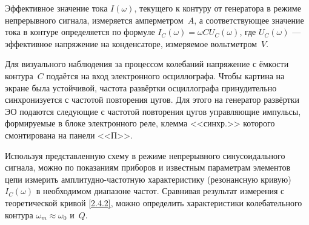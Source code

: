 Эффективное значение тока $I(\omega)$, текущего к контуру от генератора 
в режиме непрерывного сигнала, измеряется амперметром~$A$, 
а соответствующее значение тока в контуре определяется по формуле
$I_C(\omega)=\omega C U_C(\omega)$,
где $U_C(\omega)$ --- эффективное напряжение на конденсаторе, 
измеряемое вольтметром~$V$.

Для визуального наблюдения за процессом колебаний напряжение с ёмкости 
контура~$C$ подаётся на вход электронного осциллографа. Чтобы картина на 
экране была устойчивой, частота развёртки осциллографа принудительно 
синхронизуется с частотой повторения цугов. Для этого на генератор 
развёртки ЭО подаются следующие с частотой повторения цугов управляющие 
импульсы, формируемые в блоке электронного реле, клемма <<синхр.>> которого 
смонтирована на панели <<П>>.

Используя представленную схему в режиме непрерывного синусоидального 
сигнала, можно по показаниям приборов и известным параметрам элементов 
цепи измерить амплитудно-частотную характеристику (резонансную кривую) 
$I_C(\omega)$ в необходимом диапазоне частот. 
Сравнивая результат измерения с теоретической кривой \eqref{2.4.2}, можно 
определить характеристики колебательного контура $\omega_m\approx \omega_0$ и~$Q$.

  
    
